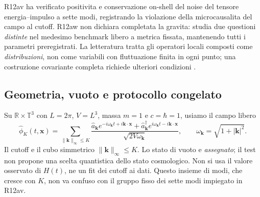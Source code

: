 \documentclass[11pt,a4paper]{article}
\begin{document}
R12av ha verificato positivita e conservazione on-shell del noise del tensore energia--impulso a sette modi, registrando la violazione della microcausalita del campo al cutoff. R12aw non dichiara completata la gravita: studia due questioni \emph{distinte} nel medesimo benchmark libero a metrica fissata, mantenendo tutti i parametri preregistrati. La letteratura tratta gli operatori locali composti come \emph{distribuzioni}, non come variabili con fluttuazione finita in ogni punto; una costruzione covariante completa richiede ulteriori condizioni \cite{HollandsWald2001LocalWick,WuFordSchiappacasse2023,HuVerdaguer2008}.

\subsection{Geometria, vuoto e protocollo congelato}
Su $\mathbb R\times\mathbb T^3$ con $L=2\pi$, $V=L^3$, massa $m=1$ e $c=\hbar=1$, usiamo il campo libero
\begin{equation}
 \hat\phi_K(t,\mathbf x)=\sum_{\|\mathbf k\|_\infty\le K}
 \frac{\hat a_{\mathbf k}e^{-i\omega_{\mathbf k}t+i\mathbf k\cdot\mathbf x}+\hat a_{\mathbf k}^\dagger e^{i\omega_{\mathbf k}t-i\mathbf k\cdot\mathbf x}}{\sqrt{2V\omega_{\mathbf k}}},
 \qquad \omega_{\mathbf k}=\sqrt{1+|\mathbf k|^2}.
 \label{eq:r12aw-field}
\end{equation}
Il cutoff e il cubo simmetrico $\|\mathbf k\|_\infty\le K$. Lo stato di vuoto e \emph{assegnato}; il test non propone una scelta quantistica dello stato cosmologico. Non si usa il valore osservato di $H(t)$, ne un fit dei cutoff ai dati. Questo insieme di modi, che cresce con $K$, non va confuso con il gruppo fisso dei sette modi impiegato in R12av.
\end{document}
